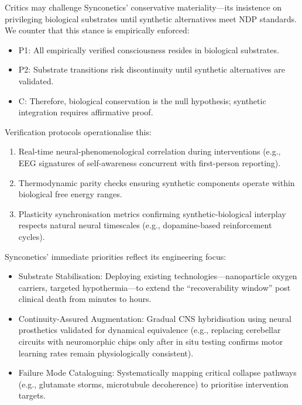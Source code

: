 \documentclass[10pt]{article}
\begin{document}
\begin{sloppypar}
  Critics may challenge Synconetics’ conservative materiality—its insistence on privileging biological substrates until synthetic alternatives meet NDP standards. We counter that this stance is empirically enforced:


  \begin{itemize}
    \item P1: All empirically verified consciousness resides in biological substrates.
    \item P2: Substrate transitions risk discontinuity until synthetic alternatives are validated.
    \item C: Therefore, biological conservation is the null hypothesis; synthetic integration requires affirmative proof.
  \end{itemize}

  Verification protocols operationalise this:

  \begin{enumerate}
    \item Real-time neural-phenomenological correlation during interventions (e.g., EEG signatures of self-awareness concurrent with first-person reporting).
    \item Thermodynamic parity checks ensuring synthetic components operate within biological free energy ranges.
    \item Plasticity synchronisation metrics confirming synthetic-biological interplay respects natural neural timescales (e.g., dopamine-based reinforcement cycles).
  \end{enumerate}

  Synconetics’ immediate priorities reflect its engineering focus:

  \begin{itemize}
    \item Substrate Stabilisation: Deploying existing technologies—nanoparticle oxygen carriers, targeted hypothermia—to extend the “recoverability window” post clinical death from minutes to hours.
    \item Continuity-Assured Augmentation: Gradual CNS hybridisation using neural prosthetics validated for dynamical equivalence (e.g., replacing cerebellar circuits with neuromorphic chips only after in situ testing confirms motor learning rates remain physiologically consistent).
    \item Failure Mode Cataloguing: Systematically mapping critical collapse pathways (e.g., glutamate storms, microtubule decoherence) to prioritise intervention targets.
  \end{itemize}


\end{sloppypar}
\end{document}
